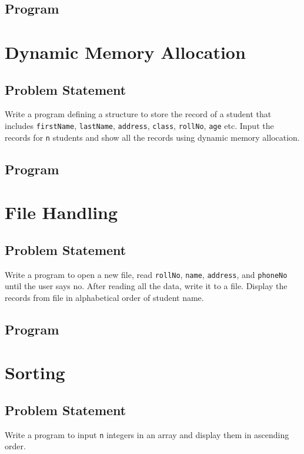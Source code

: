\documentclass[11pt]{report}
\begin{document}
\section{Program}



\chapter{Dynamic Memory Allocation}
\section{Problem Statement}
Write a program defining a structure to store the record of a student that includes \texttt{firstName}, \texttt{lastName}, \texttt{address}, \texttt{class}, \texttt{rollNo}, \texttt{age} etc. Input the records for \texttt{n} students and show all the records using dynamic memory allocation.
\section{Program}



\chapter{File Handling}
\section{Problem Statement}
Write a program to open a new file, read \texttt{rollNo}, \texttt{name}, \texttt{address}, and \texttt{phoneNo} until the user says no. After reading all the data, write it to a file. Display the records from file in alphabetical order of student name.
\section{Program}



\chapter{Sorting}
\section{Problem Statement}
Write a program to input \texttt{n} integers in an array and display them in ascending order.
\end{document}
